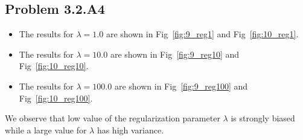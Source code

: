 \documentclass{article}
\begin{document}
\subsection{Problem 3.2.A4}
\begin{itemize}
\item The results for $\lambda = 1.0$ are shown in Fig~\ref{fig:9_reg1} and Fig~\ref{fig:10_reg1}.
\item The results for $\lambda = 10.0$ are shown in Fig~\ref{fig:9_reg10} and Fig~\ref{fig:10_reg10}.
\item The results for $\lambda = 100.0$ are shown in Fig~\ref{fig:9_reg100} and Fig~\ref{fig:10_reg100}.
\end{itemize}

We observe that low value of the regularization parameter $\lambda$ is strongly biased while a large value
for $\lambda$ has high variance.
\end{document}
